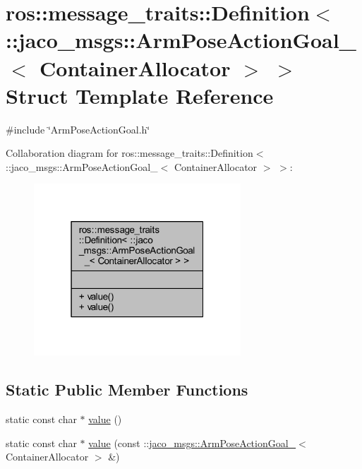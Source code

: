\hypertarget{structros_1_1message__traits_1_1Definition_3_01_1_1jaco__msgs_1_1ArmPoseActionGoal___3_01ContainerAllocator_01_4_01_4}{}\section{ros\+:\+:message\+\_\+traits\+:\+:Definition$<$ \+:\+:jaco\+\_\+msgs\+:\+:Arm\+Pose\+Action\+Goal\+\_\+$<$ Container\+Allocator $>$ $>$ Struct Template Reference}
\label{structros_1_1message__traits_1_1Definition_3_01_1_1jaco__msgs_1_1ArmPoseActionGoal___3_01ContainerAllocator_01_4_01_4}


{\ttfamily \#include \char`\"{}Arm\+Pose\+Action\+Goal.\+h\char`\"{}}



Collaboration diagram for ros\+:\+:message\+\_\+traits\+:\+:Definition$<$ \+:\+:jaco\+\_\+msgs\+:\+:Arm\+Pose\+Action\+Goal\+\_\+$<$ Container\+Allocator $>$ $>$\+:
\nopagebreak
\begin{figure}[H]
\begin{center}
\leavevmode
\includegraphics[width=220pt]{df/dc7/structros_1_1message__traits_1_1Definition_3_01_1_1jaco__msgs_1_1ArmPoseActionGoal___3_01Contain9d1a5a3f5dc92d62cf997b13431cbd0f}
\end{center}
\end{figure}
\subsection*{Static Public Member Functions}
\begin{DoxyCompactItemize}
\item 
static const char $\ast$ \hyperlink{structros_1_1message__traits_1_1Definition_3_01_1_1jaco__msgs_1_1ArmPoseActionGoal___3_01ContainerAllocator_01_4_01_4_a13776284e15a80a54e710c6713fb82b4}{value} ()
\item 
static const char $\ast$ \hyperlink{structros_1_1message__traits_1_1Definition_3_01_1_1jaco__msgs_1_1ArmPoseActionGoal___3_01ContainerAllocator_01_4_01_4_a2569f8f7c25f199b6fad888feca8ba07}{value} (const \+::\hyperlink{structjaco__msgs_1_1ArmPoseActionGoal__}{jaco\+\_\+msgs\+::\+Arm\+Pose\+Action\+Goal\+\_\+}$<$ Container\+Allocator $>$ \&)
\end{DoxyCompactItemize}


